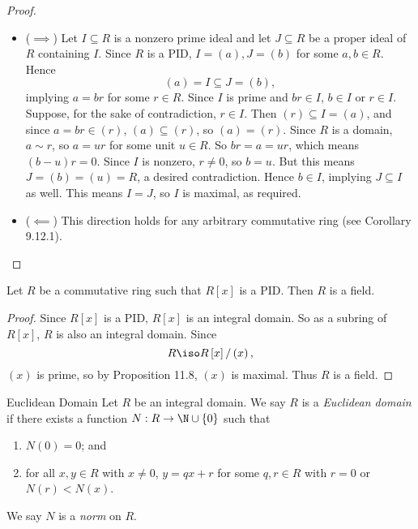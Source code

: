 \documentclass[pmath347]{subfiles}
\begin{document}
    \begin{proof}
        \begin{itemize}
            \item ($\implies$) Let $I\subseteq R$ is a nonzero prime ideal and let $J\subseteq R$ be a proper ideal of $R$ containing $I$. Since $R$ is a PID, $I=\left( a \right) , J=\left( b \right)$ for some $a,b\in R$. Hence
                \begin{equation*}
                    \left( a \right)  = I\subseteq J = \left( b \right) ,
                \end{equation*}
                implying $a=br$ for some $r\in R$. Since $I$ is prime and $br\in I$, $b\in I$ or $r\in I$. Suppose, for the sake of contradiction, $r\in I$. Then $\left( r \right) \subseteq I =\left( a \right)$, and since $a=br\in \left( r \right)$, $\left( a \right) \subseteq \left( r \right)$, so $\left( a \right) = \left( r \right)$. Since $R$ is a domain, $a\sim r$, so $a=ur$ for some unit $u\in R$. So $br=a=ur$, which means $\left( b-u \right) r = 0$. Since $I$ is nonzero, $r\neq 0$, so $b=u$. But this means $J=\left( b \right) = \left( u \right) = R$, a desired contradiction. Hence $b\in I$, implying $J\subseteq I$ as well. This means $I=J$, so $I$ is maximal, as required.
            \item ($\impliedby$) This direction holds for any arbitrary commutative ring (see Corollary 9.12.1). \qqedsym
        \end{itemize}
    \end{proof}

    \begin{cor}{}
        Let $R$ be a commutative ring such that $R\left[ x \right]$ is a PID. Then $R$ is a field.
    \end{cor}	

    \begin{proof}
        Since $R\left[ x \right]$ is a PID, $R\left[ x \right]$ is an integral domain. So as a subring of $R\left[ x \right]$, $R$ is also an integral domain. Since
        \begin{equation*}
            R\iso R\left[ x \right] /\left( x \right) ,
        \end{equation*}
        $\left( x \right)$ is prime, so by Proposition 11.8, $\left( x \right)$ is maximal. Thus $R$ is a field.
    \end{proof}

    \begin{definition}{Euclidean Domain}{}
        Let $R$ be an integral domain. We say $R$ is a \emph{Euclidean domain} if there exists a function $N:R\to\N\cup\left\lbrace 0 \right\rbrace$ such that
        \begin{enumerate}
            \item $N\left( 0 \right) = 0$; and
            \item for all $x,y\in R$ with $x\neq 0$, $y=qx+r$ for some $q,r\in R$ with $r=0$ or $N\left( r \right) < N\left( x \right)$.
        \end{enumerate}
        We say $N$ is a \emph{norm} on $R$.
    \end{definition}
\end{document}
